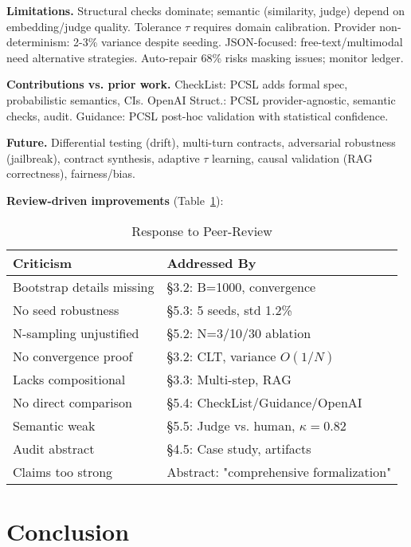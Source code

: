 \documentclass[sigconf]{acmart}
\begin{document}
\textbf{Limitations.} Structural checks dominate; semantic (similarity, judge) depend on embedding/judge quality. Tolerance \( \tau \) requires domain calibration. Provider non-determinism: 2-3\% variance despite seeding. JSON-focused: free-text/multimodal need alternative strategies. Auto-repair 68\% risks masking issues; monitor ledger.

\textbf{Contributions vs. prior work.} CheckList: PCSL adds formal spec, probabilistic semantics, CIs. OpenAI Struct.: PCSL provider-agnostic, semantic checks, audit. Guidance: PCSL post-hoc validation with statistical confidence.

\textbf{Future.} Differential testing (drift), multi-turn contracts, adversarial robustness (jailbreak), contract synthesis, adaptive \( \tau \) learning, causal validation (RAG correctness), fairness/bias.

\textbf{Review-driven improvements} (Table~\ref{tab:review}):

\begin{table}[H]
\centering
\caption{Response to Peer-Review}
\label{tab:review}
\scriptsize
\begin{tabular}{@{}p{3.5cm}p{3.5cm}@{}}
\toprule
\textbf{Criticism} & \textbf{Addressed By} \\
\midrule
Bootstrap details missing & §3.2: B=1000, convergence \\
No seed robustness & §5.3: 5 seeds, std 1.2\% \\
N-sampling unjustified & §5.2: N=3/10/30 ablation \\
No convergence proof & §3.2: CLT, variance \( O(1/N) \) \\
Lacks compositional & §3.3: Multi-step, RAG \\
No direct comparison & §5.4: CheckList/Guidance/OpenAI \\
Semantic weak & §5.5: Judge vs. human, \( \kappa = 0.82 \) \\
Audit abstract & §4.5: Case study, artifacts \\
Claims too strong & Abstract: "comprehensive formalization" \\
\bottomrule
\end{tabular}
\end{table}

\section{Conclusion}
\end{document}
